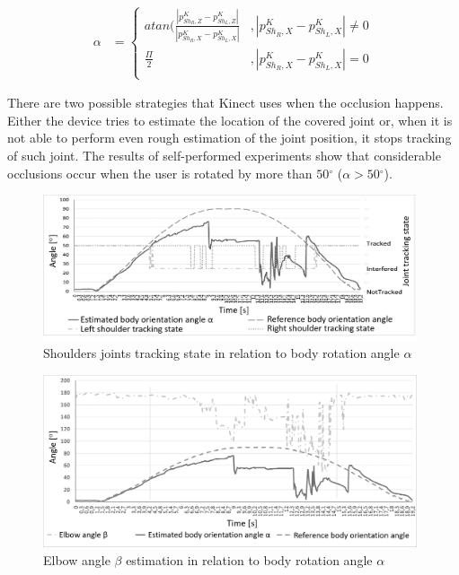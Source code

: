 \documentclass[sensors,article,submit,moreauthors,pdftex,10pt,a4paper]{mdpi}
\newcommand{\degree}{\ensuremath{{}^{\circ}}\xspace}
\begin{document}
	\begin{equation}
		\label{eq:kinect:bodyRotationAngle}
		\begin{split}
			\alpha &= 
			\begin{cases} 
				atan(\frac{|p^K_{{Sh}_R,Z} - p^K_{{Sh}_L,Z}|}{|p^K_{{Sh}_R,X} - p^K_{{Sh}_L,X}|} & , |p^K_{{Sh}_R,X} - p^K_{{Sh}_L,X}| \neq 0 \\
				\frac{\Pi}{2}                                                                    & , |p^K_{{Sh}_R,X} - p^K_{{Sh}_L,X}| = 0    \\		
			\end{cases}
		\end{split}
	\end{equation}
	
	There are two possible strategies that Kinect uses when the occlusion happens. Either the device tries to estimate the location of the covered joint or, when it is not able to perform even rough estimation of the joint position, it stops tracking of such joint. The results of self-performed experiments show that considerable occlusions occur when the user is rotated by more than $50\degree$ ($\alpha > 50\degree$). 
	
	\begin{figure}[H]
		\centering
		\includegraphics[width=11cm]{Figure4.png}
		\caption{Shoulders joints tracking state in relation to body rotation angle $\alpha$}
		\label{fig:kinect:trackingVsAlpha}
	\end{figure}
	
	\begin{figure}[H]
		\centering
		\includegraphics[width=11cm]{Figure5.png}
		\caption{Elbow angle $\beta$ estimation in relation to body rotation angle $\alpha$}
		\label{fig:kinect:betaVsAlpha}
	\end{figure}
	
\end{document}
